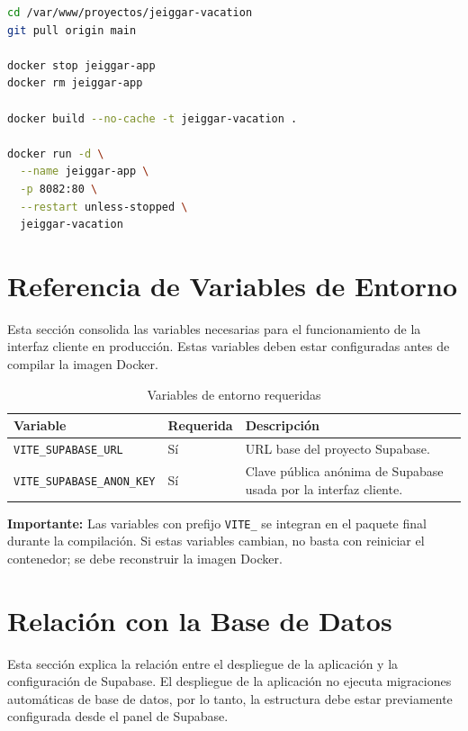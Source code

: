 \documentclass[12pt,letterpaper]{article}
\newcommand{\code}[1]{\nolinkurl{#1}}
\begin{document}
\begin{lstlisting}[language=bash]
cd /var/www/proyectos/jeiggar-vacation
git pull origin main

docker stop jeiggar-app
docker rm jeiggar-app

docker build --no-cache -t jeiggar-vacation .

docker run -d \
  --name jeiggar-app \
  -p 8082:80 \
  --restart unless-stopped \
  jeiggar-vacation
\end{lstlisting}

\section{Referencia de Variables de Entorno}

Esta sección consolida las variables necesarias para el funcionamiento de la interfaz cliente en producción. Estas variables deben estar configuradas antes de compilar la imagen Docker.

\begin{longtable}{|p{}|p{0.18\textwidth}|p{0.36\textwidth}|}
\caption{Variables de entorno requeridas}\\
\hline
\textbf{Variable} & \textbf{Requerida} & \textbf{Descripción} \\
\hline
\code{VITE_SUPABASE_URL} & Sí & URL base del proyecto Supabase. \\
\hline
\code{VITE_SUPABASE_ANON_KEY} & Sí & Clave pública anónima de Supabase usada por la interfaz cliente. \\
\hline
\end{longtable}

\textbf{Importante:} Las variables con prefijo \code{VITE_} se integran en el paquete final durante la compilación. Si estas variables cambian, no basta con reiniciar el contenedor; se debe reconstruir la imagen Docker.

\section{Relación con la Base de Datos}

Esta sección explica la relación entre el despliegue de la aplicación y la configuración de Supabase. El despliegue de la aplicación no ejecuta migraciones automáticas de base de datos, por lo tanto, la estructura debe estar previamente configurada desde el panel de Supabase.
\end{document}
